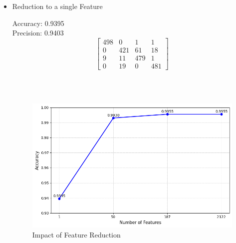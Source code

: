 \documentclass{article}
\begin{document}
\begin{itemize}
    \item Reduction to a single Feature
    \begin{itemize}
 
        Accuracy: 0.9395
        \\
        Precision: 0.9403
        \\
        \[
        \begin{bmatrix}
        498 & 0   & 1   & 1 \\
        0   & 421 & 61  & 18 \\
        9   & 11  & 479 & 1 \\
        0   & 19  & 0   & 481
        \end{bmatrix}
        \]

    \end{itemize}
    \\
    \vspace{1cm}
    \\
    \begin{figure}[h]
        \centering
        \includegraphics[width=1\linewidth]{feature_reduction.jpg}
        \caption{Impact of Feature Reduction}
        \label{fig:feature_reduction_impact}
    \end{figure}

\end{itemize}
\end{document}
